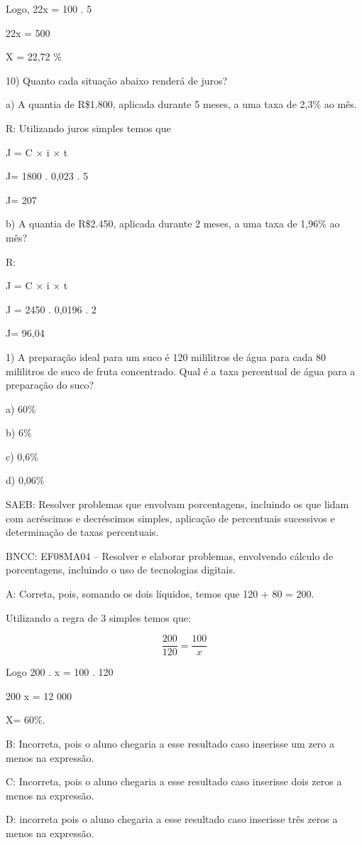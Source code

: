 Logo, 22x = 100 . 5

22x = 500

X = 22,72 \%

10) Quanto cada situação abaixo renderá de juros?

a) A quantia de R\$1.800, aplicada durante 5 meses, a uma taxa de 2,3\%
ao mês.

R: Utilizando juros simples temos que

J = C × i × t

J= 1800 . 0,023 . 5

J= 207

b) A quantia de R\$2.450, aplicada durante 2 meses, a uma taxa de 1,96\%
ao mês?

R:

J = C × i × t

J = 2450 . 0,0196 . 2

J= 96,04


1) A preparação ideal para um suco é 120 mililitros de água para cada 80
mililitros de suco de fruta concentrado. Qual é a taxa percentual de
água para a preparação do suco?

a) 60\%

b) 6\%

c) 0,6\%

d) 0,06\%

SAEB: Resolver problemas que envolvam porcentagens, incluindo os que
lidam com acréscimos e decréscimos simples, aplicação de percentuais
sucessivos e determinação de taxas percentuais.

BNCC: EF08MA04 -- Resolver e elaborar problemas, envolvendo cálculo de
porcentagens, incluindo o uso de tecnologias digitais.

A: Correta, pois, somando os dois líquidos, temos que 120 + 80 = 200.

Utilizando a regra de 3 simples temos que:

\[\frac {200}{120} = \frac {100}{x}\]

Logo 200 . x = 100 . 120

200 x = 12 000

X= 60\%.

B: Incorreta, pois o aluno chegaria a esse resultado caso inserisse um
zero a menos na expressão.

C: Incorreta, pois o aluno chegaria a esse resultado caso inserisse dois
zeros a menos na expressão.

D: incorreta pois o aluno chegaria a esse resultado caso inserisse três
zeros a menos na expressão.

